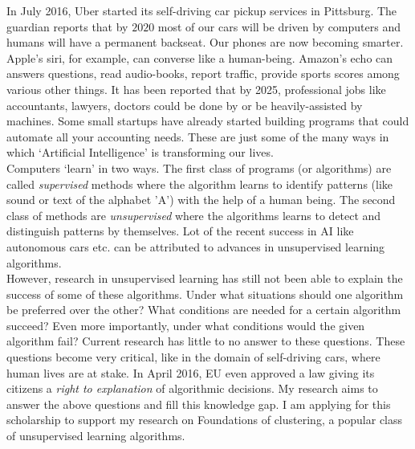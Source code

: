 \documentclass[12pt]{article}
\begin{document}
\linespread{0.901}
In July 2016, Uber started its self-driving car pickup services in Pittsburg. The guardian reports that by $2020$ most of our cars will be driven by computers and humans will have a permanent backseat. Our phones are now becoming smarter. Apple's siri, for example, can converse like a human-being. Amazon's echo can answers questions, read audio-books, report traffic, provide sports scores among various other things. It has been reported that by 2025, professional jobs like accountants, lawyers, doctors could be done by or be heavily-assisted by machines. Some small startups have already started building programs that could automate all your accounting needs. These are just some of the many ways in which `Artificial Intelligence' is transforming our lives.\\

Computers `learn' in two ways. The first class of programs (or algorithms) are called \textit{supervised} methods where the algorithm learns to identify patterns (like sound or text of the alphabet 'A') with the help of a human being.  The second class of methods are \textit{unsupervised} where the algorithms learns to detect and distinguish patterns by themselves. Lot of the recent success in AI like autonomous cars etc. can be attributed to advances in unsupervised learning algorithms. \\

However, research in unsupervised learning has still not been able to explain the success of some of these algorithms. Under what situations should one algorithm be preferred over the other? What conditions are needed for a certain algorithm succeed? Even more importantly, under what conditions would the given algorithm fail? Current research has little to no answer to these questions. These questions become very critical, like in the domain of self-driving cars, where human lives are at stake. In April 2016, EU even approved a law giving its citizens a \textit{right to explanation} of algorithmic decisions. My research aims to answer the above questions and fill this knowledge gap. I am applying for this scholarship  to support my research on {Foundations of clustering}, a popular class of unsupervised learning algorithms. 
\end{document}
